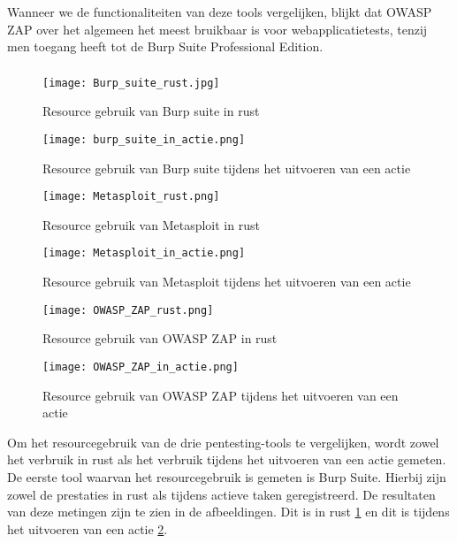 Wanneer we de functionaliteiten van deze tools vergelijken, blijkt dat OWASP ZAP over het algemeen het meest bruikbaar is voor 
webapplicatietests, tenzij men toegang heeft tot de Burp Suite Professional Edition.
\subsubsection{}
\begin{figure}
    \centering
    \texttt{[image: Burp\_suite\_rust.jpg]}
    \caption[Resource gebruik van Burp suite in rust]{Resource gebruik van Burp suite in rust}
    \label{fig:burp_suite_rust}
\end{figure}
\begin{figure}
    \centering
    \texttt{[image: burp\_suite\_in\_actie.png]}
    \caption[Resource gebruik van Burp suite tijdens het uitvoeren van een actie]{Resource gebruik van Burp suite tijdens het uitvoeren van een actie}
    \label{fig:burp_suite_actie}
\end{figure}
\begin{figure}
    \centering
    \texttt{[image: Metasploit\_rust.png]}
    \caption[Resource gebruik van Metasploit in rust]{Resource gebruik van Metasploit in rust}
    \label{fig:metasploit_rust}
\end{figure}
\begin{figure}
    \centering
    \texttt{[image: Metasploit\_in\_actie.png]}
    \caption[Resource gebruik van Metasploit tijdens het uitvoeren van een actie]{Resource gebruik van Metasploit tijdens het uitvoeren van een actie}
    \label{fig:metasploit_actie}
\end{figure}
\begin{figure}
    \centering
    \texttt{[image: OWASP\_ZAP\_rust.png]}
    \caption[Resource gebruik van OWASP ZAP in rust]{Resource gebruik van OWASP ZAP in rust}
    \label{fig:owasp_rust}
\end{figure}
\begin{figure}
    \centering
    \texttt{[image: OWASP\_ZAP\_in\_actie.png]}
    \caption[Resource gebruik van OWASP ZAP tijdens het uitvoeren van een actie]{Resource gebruik van OWASP ZAP tijdens het uitvoeren van een actie}
    \label{fig:owasp_actie}
\end{figure}
Om het resourcegebruik van de drie pentesting-tools te vergelijken, wordt zowel het verbruik in rust als het verbruik tijdens het 
uitvoeren van een actie gemeten. De eerste tool waarvan het resourcegebruik is gemeten is Burp Suite. Hierbij zijn zowel de 
prestaties in rust als tijdens actieve taken geregistreerd. De resultaten van deze metingen zijn te zien in de afbeeldingen. 
Dit is in rust \ref{fig:burp_suite_rust} en dit is tijdens het uitvoeren van een actie \ref{fig:burp_suite_actie}. 

